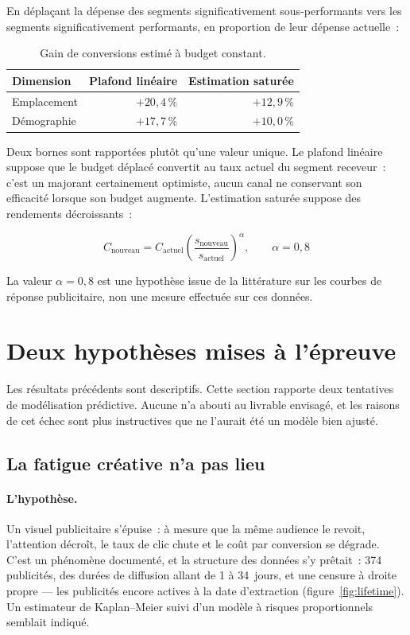 \documentclass[11pt,a4paper]{article}
\begin{document}
En déplaçant la dépense des segments significativement sous-performants vers
les segments significativement performants, en proportion de leur dépense
actuelle~:

\begin{table}[h]
\centering
\small
\begin{tabular}{@{}lrr@{}}
\toprule
\textbf{Dimension} & \textbf{Plafond linéaire} & \textbf{Estimation saturée} \\
\midrule
Emplacement & $+20{,}4\,\%$ & $+12{,}9\,\%$ \\
Démographie & $+17{,}7\,\%$ & $+10{,}0\,\%$ \\
\bottomrule
\end{tabular}
\caption{Gain de conversions estimé à budget constant.}
\end{table}

Deux bornes sont rapportées plutôt qu'une valeur unique. Le plafond linéaire
suppose que le budget déplacé convertit au taux actuel du segment receveur~:
c'est un majorant certainement optimiste, aucun canal ne conservant son
efficacité lorsque son budget augmente. L'estimation saturée suppose des
rendements décroissants~:

\begin{equation}
  C_{\text{nouveau}} = C_{\text{actuel}}
  \left(\frac{s_{\text{nouveau}}}{s_{\text{actuel}}}\right)^{\alpha},
  \qquad \alpha = 0{,}8
\end{equation}

La valeur $\alpha = 0{,}8$ est une hypothèse issue de la littérature sur les
courbes de réponse publicitaire, non une mesure effectuée sur ces données.

\section{Deux hypothèses mises à l'épreuve}

Les résultats précédents sont descriptifs. Cette section rapporte deux
tentatives de modélisation prédictive. Aucune n'a abouti au livrable envisagé,
et les raisons de cet échec sont plus instructives que ne l'aurait été un
modèle bien ajusté.

\subsection{La fatigue créative n'a pas lieu}

\paragraph{L'hypothèse.} Un visuel publicitaire s'épuise~: à mesure que la même
audience le revoit, l'attention décroît, le taux de clic chute et le coût par
conversion se dégrade. C'est un phénomène documenté, et la structure des
données s'y prêtait~: \num{374} publicités, des durées de diffusion allant de 1
à 34~jours, et une censure à droite propre --- les publicités encore actives à
la date d'extraction (figure~\ref{fig:lifetime}). Un estimateur de
Kaplan--Meier suivi d'un modèle à risques proportionnels semblait indiqué.
\end{document}
